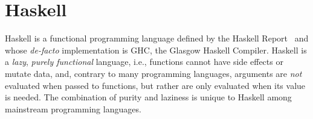 \documentclass[]{lwnovathesis}
\newcommand{\mypara}[1]{\paragraph{\textbf{#1}.}}
\newcommand{\lolli}{\multimap}
\newcommand{\bang}{{!}}
\newcommand{\llet}[2]{\mathsf{let}~#1~\mathsf{in}~#2}
\begin{document}










\section{Haskell}

Haskell is a functional programming language defined by the Haskell
Report~\cite{jones1999haskell,marlow2010haskell} and whose \emph{de-facto}
implementation is GHC, the Glasgow Haskell Compiler\cite{GHC}. Haskell is a
\emph{lazy}, \emph{purely functional} language, i.e., functions cannot
have side effects or mutate data, and, contrary to many programming languages,
arguments are \emph{not} evaluated when passed to functions, but rather are only
evaluated when its value is needed. The combination of purity and laziness is
unique to Haskell among mainstream programming languages.
\end{document}
